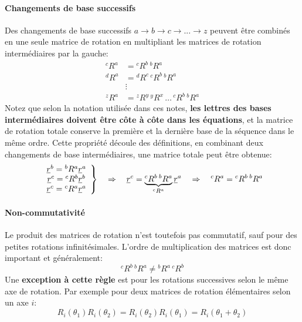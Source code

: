 \paragraph{Changements de base successifs}

Des changements de base successifs $a \rightarrow b \rightarrow c \rightarrow ... \rightarrow z$  peuvent être combinés en une seule matrice de rotation en multipliant les matrices de rotation intermédiaires par la gauche:
\begin{align}
{}^cR^a &=  {}^cR^b \, {}^bR^a \\
{}^dR^a &=  {}^dR^c \, {}^cR^b \, {}^bR^a \\
& \vdots \\
{}^zR^a &=  {}^zR^y \, {}^yR^x \, \hdots \, {}^cR^b \, {}^bR^a
\end{align}
Notez que selon la notation utilisée dans ces notes, \textbf{les lettres des bases intermédiaires doivent être côte à côte dans les équations}, et la matrice de rotation totale conserve la première et la dernière base de la séquence dans le même ordre. Cette propriété découle des définitions, en combinant deux changements de base intermédiaires, une matrice totale peut être obtenue:
\begin{align}
	\left. \begin{array}{c}
			   \underline{r}^b = {}^bR^a \underline{r}^a \\  \underline{r}^c = {}^cR^b \underline{r}^b \\ \underline{r}^c = {}^cR^a \underline{r}^a
	\end{array} \right\} \quad \Rightarrow \quad \underline{r}^c = \underbrace{{}^cR^b \,  {}^bR^a}_{ {}^cR^a } \underline{r}^a \quad \Rightarrow \quad {}^cR^a  = {}^cR^b \,  {}^bR^a
\end{align}

\paragraph{Non-commutativité}

Le produit des matrices de rotation n'est toutefois pas commutatif, sauf pour des petites rotations infinitésimales. L'ordre de multiplication des matrices est donc important et généralement:
\begin{equation}
	^cR^b \, ^bR^a \ne {}^bR^a \, ^cR^b
\end{equation}
Une \textbf{exception à cette règle} est pour les rotations successives selon le même axe de rotation. Par exemple pour deux matrices de rotation élémentaires selon un axe $i$:
\begin{equation}
	R_i( \theta_1 ) R_i( \theta_2 )  = R_i( \theta_2 ) R_i( \theta_1 ) = R_i( \theta_1 + \theta_2 )
\end{equation}



